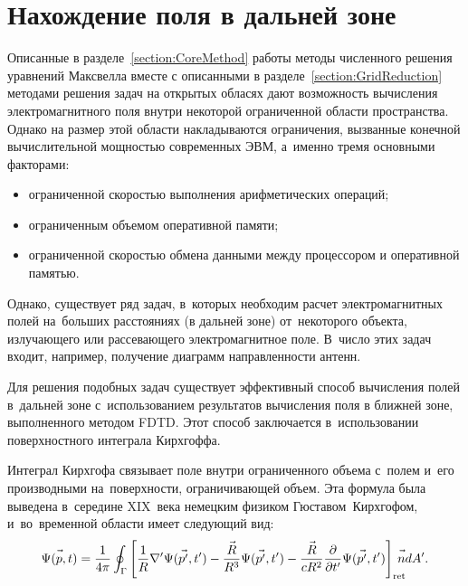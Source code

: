 

\section{Нахождение поля в дальней зоне}

Описанные в разделе~\ref{section:CoreMethod} работы методы численного решения
уравнений Максвелла вместе с описанными в разделе~\ref{section:GridReduction}
методами решения задач на открытых обласях дают возможность вычисления
электромагнитного поля внутри некоторой ограниченной области пространства.
Однако на размер этой области накладываются ограничения, вызванные конечной
вычислительной мощностью современных ЭВМ, а~именно тремя основными факторами:
\begin{itemize}
\item ограниченной скоростью выполнения арифметических операций;
\item ограниченным объемом оперативной памяти;
\item ограниченной скоростью обмена данными между процессором
      и оперативной памятью.
\end{itemize}
Однако, существует ряд задач, в~которых необходим расчет электромагнитных полей
на~больших расстояниях (в дальней зоне) от~некоторого объекта, излучающего или
рассевающего электромагнитное поле. В~число этих задач входит, например,
получение диаграмм направленности антенн.

Для решения подобных задач существует эффективный способ вычисления полей
в~дальней зоне с~использованием результатов вычисления поля в ближней зоне,
выполненного методом FDTD. Этот способ заключается в~использовании
поверхностного интеграла Кирхгоффа.

Интеграл Кирхгофа связывает поле внутри ограниченного объема с~полем и~его
производными на~поверхности, ограничивающей объем. Эта формула была выведена
в~середине XIX~века немецким физиком Гюставом~Кирхгофом, и~во~временной области
имеет следующий вид:
\begin{equation}
    \label{eq:KirchhoffIntegral}
    \Psi(\vec{p\mathstrut},t) = \frac{1}{4\pi} \oint_\Gamma
    \left[
        \frac{1}{R}\nabla'\Psi(\vec{p'\mathstrut},t') -
        \frac{\vec{R\mathstrut}}{R^3}\Psi(\vec{p'\mathstrut},t') -
        \frac{\vec{R\mathstrut}}{cR^2}\frac{\partial}{\partial t'}\Psi(\vec{p'\mathstrut},t')
    \right]_\text{ret} \!\!\!\!\!\vec{n\mathstrut} dA'.
\end{equation}

